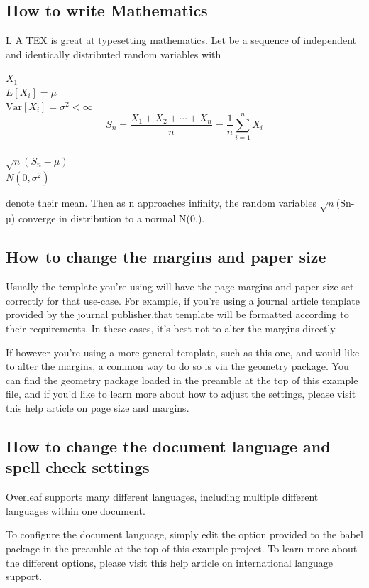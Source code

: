 \documentclass{article}
\begin{document}
	\subsection{How to write Mathematics}
    L A TEX is great at typesetting mathematics. Let  be a sequence of independent and
    identically distributed random variables with
    
    	$X_1$ \\
    $E[X_i] =\mu$ \\
    $\mathrm{Var}[X_i]=\sigma^2 < \infty$ \\
    
    \[S_n=\frac{X_1+X_2+\cdots+X_n}{n}=\frac{1}{n} \sum_{i=1}^n X_i\] \\
    $\sqrt{n}(S_n-\mu)$ \\
    $N (0,\sigma^2)$

    denote their mean. Then as n approaches infinity, the random variables  \(\sqrt{n}\)(Sn-µ) converge in
    distribution to a normal N(0,).
    
    \subsection{How to change the margins and paper size}
    Usually the template you’re using will have the page margins and paper size set correctly for that use-case. For example, if you’re using a journal article template provided by the journal publisher,that template will be formatted according to their requirements. In these cases, it’s best not to alter
    the margins directly.
    
    If however you’re using a more general template, such as this one, and would like to alter the margins, a common way to do so is via the geometry package. You can find the geometry package loaded in the preamble at the top of this example file, and if you’d like to learn more about how to
    adjust the settings, please visit this help article on page size and margins.
    
    \subsection{How to change the document language and spell check settings}
    Overleaf supports many different languages, including multiple different languages within one document.
    
    To configure the document language, simply edit the option provided to the babel package in the preamble at the top of this example project. To learn more about the different options, please visit this help article on international language support.
\end{document}
